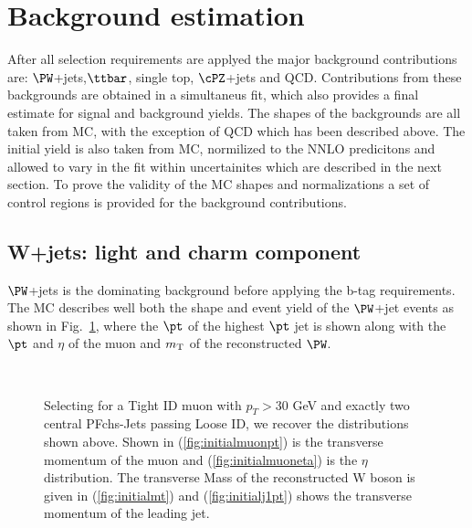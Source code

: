 \section{Background estimation}\label{BkgControl}

After all selection requirements are applyed the major background contributions are:
$\PW$+jets,$\ttbar$, single top, $\cPZ$+jets and QCD. Contributions from these backgrounds are obtained in 
a simultaneus fit, which also provides a final estimate for signal and background yields.
The shapes of the backgrounds are all taken from MC, with the exception of QCD which has been described above. The initial yield is also
taken from MC, normilized to the NNLO predicitons and allowed to vary in the fit within
uncertainites which are described in the next section.
To prove the validity of the MC shapes and normalizations a set of control regions is 
provided for the background contributions.

\subsection{W+jets: light and charm component}

$\PW$+jets is the dominating background before
applying the b-tag requirements.
The MC describes well both the shape
and event yield of the $\PW$+jet events as shown
in Fig.~\ref{fig:wjj_plots}, where the $\pt$ 
of the highest $\pt$ jet is shown along with the $\pt$ and $\eta$ of the
muon and $m_\mathrm{T}$ of the reconstructed $\PW$.

\begin{figure}
 \center
 \\
 \caption{
  Selecting for a Tight ID muon with $p_{T}>$30 GeV and exactly two central PFchs-Jets passing Loose ID,
   we recover the distributions shown above. 
  Shown in (\ref{fig:initialmuonpt}) is the transverse momentum of the muon
   and (\ref{fig:initialmuoneta}) is the $\eta$ distribution.
  The transverse Mass of the reconstructed W boson is given in (\ref{fig:initialmt})
   and (\ref{fig:initialj1pt}) shows the transverse momentum of the leading jet.
 } 
    \label{fig:wjj_plots}
\end{figure}

